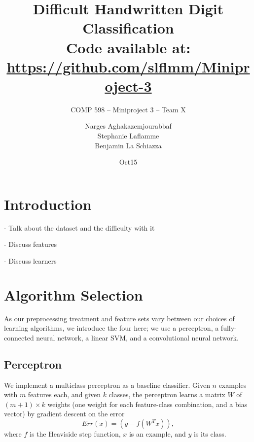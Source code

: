 \documentclass{acm_proc_article-sp}
\begin{document}
\title{Difficult Handwritten Digit Classification \\
{\normalsize Code available at: \url{https://github.com/slflmm/Miniproject-3}}} 
\subtitle{COMP 598 -- Miniproject 3 -- Team X}

\author{
\alignauthor 
Narges Aghakazemjourabbaf\\
\alignauthor
Stephanie Laflamme\\
\alignauthor Benjamin La Schiazza\\
}

\date{Oct15}



\maketitle
\begin{abstract}

\end{abstract}

\section{Introduction}%
- Talk about the dataset and the difficulty with it

- Discuss features

- Discuss learners


\section{Algorithm Selection}%
As our preprocessing treatment and feature sets vary between our choices of learning algorithms, we introduce the four here; we use a perceptron, a fully-connected neural network, a linear SVM, and a convolutional neural network.

\subsection{Perceptron}
We implement a multiclass perceptron as a baseline classifier. Given $n$ examples with $m$ features each, and given $k$ classes, the perceptron learns a matrix $W$ of $(m+1) \times k$ weights (one weight for each feature-class combination, and a bias vector) by gradient descent on the error $$Err(x) = (y - f(W^Tx)),$$
where $f$ is the Heaviside step function, $x$ is an example, and $y$ is its class.
\end{document}
